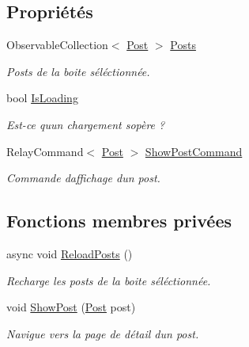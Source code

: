 \subsection*{Propriétés}
\begin{DoxyCompactItemize}
\item 
Observable\+Collection$<$ \hyperlink{class_boxes_1_1_models_1_1_post}{Post} $>$ \hyperlink{class_boxes_1_1_view_models_1_1_home_view_model_a64608b92284b13db11abf18c5bca8a6b}{Posts}
\begin{DoxyCompactList}\small\item\em Posts de la boite séléctionnée. \end{DoxyCompactList}\item 
bool \hyperlink{class_boxes_1_1_view_models_1_1_home_view_model_a439e8cc0dbe399422652382d76ab674f}{Is\+Loading}
\begin{DoxyCompactList}\small\item\em Est-\/ce qu\textquotesingle{}un chargement s\textquotesingle{}opère ? \end{DoxyCompactList}\item 
Relay\+Command$<$ \hyperlink{class_boxes_1_1_models_1_1_post}{Post} $>$ \hyperlink{class_boxes_1_1_view_models_1_1_home_view_model_ae2f37a3465da061c17aa9694e8dbdf54}{Show\+Post\+Command}
\begin{DoxyCompactList}\small\item\em Commande d\textquotesingle{}affichage d\textquotesingle{}un post. \end{DoxyCompactList}\end{DoxyCompactItemize}
\subsection*{Fonctions membres privées}
\begin{DoxyCompactItemize}
\item 
async void \hyperlink{class_boxes_1_1_view_models_1_1_home_view_model_a72d97f5c62e4819aebba4bbae3110785}{Reload\+Posts} ()
\begin{DoxyCompactList}\small\item\em Recharge les posts de la boite séléctionnée. \end{DoxyCompactList}\item 
void \hyperlink{class_boxes_1_1_view_models_1_1_home_view_model_aeb3509eee7ffa0c2b1d9edda2ee64772}{Show\+Post} (\hyperlink{class_boxes_1_1_models_1_1_post}{Post} post)
\begin{DoxyCompactList}\small\item\em Navigue vers la page de détail d\textquotesingle{}un post. \end{DoxyCompactList}\end{DoxyCompactItemize}
